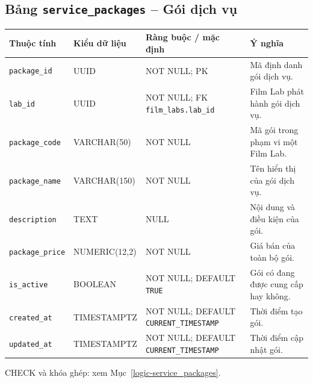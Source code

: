 \subsection{Bảng \texttt{service\_\allowbreak{}packages} -- Gói dịch vụ}
\label{dictionary-service_packages}
\begingroup
\footnotesize
\setlength{\tabcolsep}{3pt}
\begin{longtable}{>{\raggedright\arraybackslash}p{3.1cm}>{\raggedright\arraybackslash}p{2.5cm}>{\raggedright\arraybackslash}p{3.7cm}>{\raggedright\arraybackslash}p{4.3cm}}
\toprule
Thuộc tính & Kiểu dữ liệu & Ràng buộc / mặc định & Ý nghĩa \\
\midrule
\endhead
\texttt{package\_\allowbreak{}id} & UUID & NOT NULL; PK & Mã định danh gói dịch vụ. \\
\texttt{lab\_\allowbreak{}id} & UUID & NOT NULL; FK \texttt{film\_\allowbreak{}labs.lab\_\allowbreak{}id} & Film Lab phát hành gói dịch vụ. \\
\texttt{package\_\allowbreak{}code} & VARCHAR(50) & NOT NULL & Mã gói trong phạm vi một Film Lab. \\
\texttt{package\_\allowbreak{}name} & VARCHAR(150) & NOT NULL & Tên hiển thị của gói dịch vụ. \\
\texttt{description} & TEXT & NULL & Nội dung và điều kiện của gói. \\
\texttt{package\_\allowbreak{}price} & NUMERIC(12,2) & NOT NULL & Giá bán của toàn bộ gói. \\
\texttt{is\_\allowbreak{}active} & BOOLEAN & NOT NULL; DEFAULT \texttt{TRUE} & Gói có đang được cung cấp hay không. \\
\texttt{created\_\allowbreak{}at} & TIMESTAMPTZ & NOT NULL; DEFAULT \texttt{CURRENT\_\allowbreak{}TIMESTAMP} & Thời điểm tạo gói. \\
\texttt{updated\_\allowbreak{}at} & TIMESTAMPTZ & NOT NULL; DEFAULT \texttt{CURRENT\_\allowbreak{}TIMESTAMP} & Thời điểm cập nhật gói. \\
\bottomrule
\end{longtable}
\endgroup
CHECK và khóa ghép: xem Mục~\ref{logic-service_packages}.
